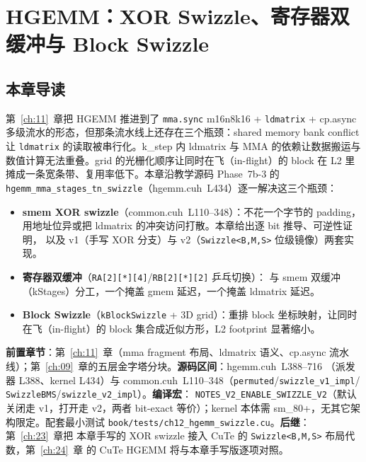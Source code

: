 \chapter{HGEMM：XOR Swizzle、寄存器双缓冲与 Block Swizzle}\label{ch:12}

\section{本章导读}

第~\ref{ch:11}~章把 HGEMM 推进到了 \texttt{mma.sync} m16n8k16 + \texttt{ldmatrix} +
cp.async 多级流水的形态，但那条流水线上还存在三个瓶颈：shared memory bank
conflict 让 \texttt{ldmatrix} 的读取被串行化。k\_step 内 ldmatrix 与 MMA
的依赖让数据搬运与数值计算无法重叠。grid 的光栅化顺序让同时在飞（in-flight）的
block 在 L2 里摊成一条宽条带、复用率低下。本章沿教学源码 Phase~7b-3 的
\texttt{hgemm\_\allowbreak{}mma\_\allowbreak{}stages\_\allowbreak{}tn\_\allowbreak{}swizzle}（hgemm.cuh~L434）逐一解决这三个瓶颈：

\begin{itemize}
  \item \textbf{smem XOR swizzle}（common.cuh~L110--348）：不花一个字节的 padding，
        用地址位异或把 ldmatrix 的冲突访问打散。本章给出逐 bit 推导、可逆性证明，
        以及 v1（手写 XOR 分支）与 v2（\texttt{Swizzle\allowbreak{}<B,\allowbreak{}M,\allowbreak{}S>} 位级镜像）两套实现。
  \item \textbf{寄存器双缓冲}（\texttt{RA[2][*][4]}/\texttt{RB[2][*][2]} 乒乓切换）：
        与 smem 双缓冲（kStages）分工，一个掩盖 gmem 延迟，一个掩盖 ldmatrix 延迟。
  \item \textbf{Block Swizzle}（\texttt{k\allowbreak{}Block\allowbreak{}Swizzle} + 3D grid）：重排 block
        坐标映射，让同时在飞（in-flight）的 block 集合成近似方形，L2 footprint 显著缩小。
\end{itemize}

\textbf{前置章节}：第~\ref{ch:11}~章（mma fragment 布局、ldmatrix 语义、cp.async
流水线）；第~\ref{ch:09}~章的五层金字塔分块。\textbf{源码区间}：hgemm.cuh~L388--716
（派发器 L388、kernel L434）与 common.cuh~L110--348（\texttt{permuted}/\texttt{swizzle\_\allowbreak{}v1\_\allowbreak{}impl}/
\texttt{SwizzleBMS}/\texttt{swizzle\_\allowbreak{}v2\_\allowbreak{}impl}）。\textbf{编译宏}：
\texttt{NOTES\_\allowbreak{}V2\_\allowbreak{}ENABLE\_\allowbreak{}SWIZZLE\_\allowbreak{}V2}（默认关闭走 v1，打开走 v2，两者 bit-exact
等价）；kernel 本体需 sm\_80+，无其它架构限定。配套最小测试
\texttt{book/\allowbreak{}tests/\allowbreak{}ch12\_\allowbreak{}hgemm\_\allowbreak{}swizzle.cu}。\textbf{后继}：第~\ref{ch:23}~章把
本章手写的 XOR swizzle 接入 CuTe 的 \texttt{Swizzle\allowbreak{}<B,\allowbreak{}M,\allowbreak{}S>} 布局代数，第~\ref{ch:24}~章
的 CuTe HGEMM 将与本章手写版逐项对照。

